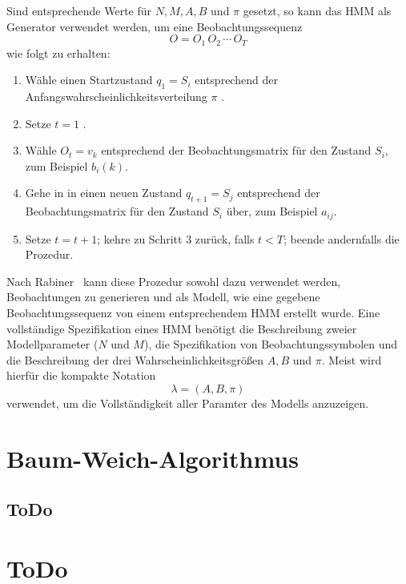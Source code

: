 Sind entsprechende Werte f\"ur $N, M, A, B$ und $\pi$ gesetzt, so kann das \acrshort{HMM} als Generator verwendet werden, um eine Beobachtungssequenz 
\begin{equation}
O = O_1 \, O_2 \, \cdots \, O_T
\end{equation}
wie folgt zu erhalten:
\begin{enumerate}
\item W\"ahle einen Startzustand $q_1 = S_i$ entsprechend der Anfangswahrscheinlichkeitsverteilung $\pi$ .
\item Setze $t = 1$ .
\item W\"ahle $O_t = v_k$ entsprechend der Beobachtungsmatrix f\"ur den Zustand $S_i$, zum Beispiel $b_i(k)$.
\item Gehe in in einen neuen Zustand $q_{t+1} = S_j$ entsprechend der Beobachtungsmatrix f\"ur den Zustand $S_i$ \"uber, zum Beispiel $a_{ij}$.
\item Setze $t = t+ 1$; kehre zu Schritt 3 zur\"uck, falls $t < T$; beende andernfalls die Prozedur.
\end{enumerate}
Nach Rabiner~\cite[S. 5]{bib:hmmrabiner} kann diese Prozedur sowohl dazu verwendet werden, Beobachtungen zu generieren und als Modell, wie eine gegebene Beobachtungssequenz von einem entsprechendem \acrshort{HMM} erstellt wurde.
\newline
Eine vollst\"andige Spezifikation eines \acrshort{HMM} ben\"otigt die Beschreibung zweier Modellparameter ($N$ und $M$), die Spezifikation von Beobachtungssymbolen und die Beschreibung der drei Wahrscheinlichkeitsgr\"o\ss en $A, B$ und $\pi$.
Meist wird hierf\"ur die kompakte Notation
\begin{equation}
\lambda = (A, B, \pi)
\end{equation}
verwendet, um die Vollst\"andigkeit aller Paramter des Modells anzuzeigen.
\section{Baum-Weich-Algorithmus}

\subsection{ToDo}

\section{ToDo}
